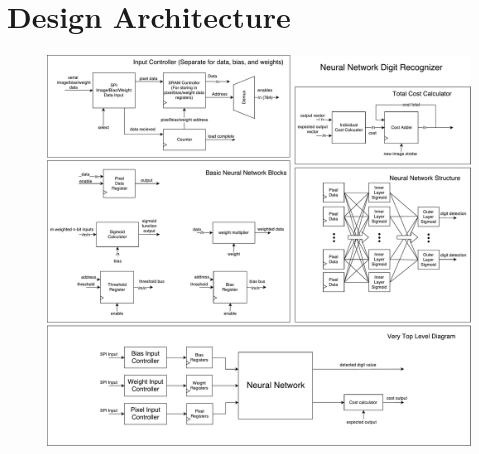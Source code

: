 \documentclass[12pt]{article}
\begin{document}
\section{Design Architecture}
\begin{figure}[H]
  \centering
  \includegraphics[width=\textwidth]{digit_recognizer.pdf}
\end{figure}
\end{document}
